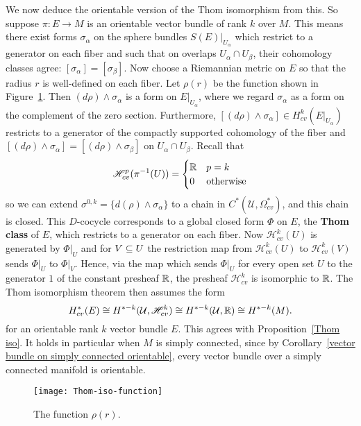 We now deduce the orientable version of the Thom isomorphism from this. So suppose $\pi:E\to M$ is an orientable vector bundle of rank $k$ over $M$. This means there 
exist forms $\sigma_\alpha$ on the sphere bundles $S(E)|_{U_\alpha}$ which restrict to a generator on each fiber and such that on overlaps $U_\alpha\cap U_\beta$, 
their cohomology classes agree: $[\sigma_\alpha]=[\sigma_\beta]$. Now choose a Riemannian metric on $E$ so that the radius $r$ is well-defined on each fiber. Let $\rho(r)$ 
be the function shown in Figure~\ref{Thom iso function rho(r)}. Then $(d\rho)\wedge\sigma_\alpha$ is a form on $E|_{U_\alpha}$, where we regard $\sigma_\alpha$ as a form 
on the complement of the zero section. Furthermore, $[(d\rho)\wedge\sigma_\alpha]\in H^k_{cv}(E|_{U_\alpha})$ restricts to a generator of the compactly supported 
cohomology of the fiber and $[(d\rho)\wedge\sigma_\alpha]=[(d\rho)\wedge\sigma_\beta]$ on $U_\alpha\cap U_\beta$. Recall that 
\[\mathscr{H}^p_{cv}(\pi^{-1}(U))=\begin{cases}
\mathbb{R}&p=k\\
0&\text{otherwise}
\end{cases}\]
so we can extend $\sigma^{0,k}=\{d(\rho)\wedge\sigma_\alpha\}$ to a chain in $C^*(\mathcal{U},\Omega_{cv}^*)$, and this chain is closed. This $D$-cocycle corresponds 
to a global closed form $\Phi$ on $E$, the \textbf{Thom class} of $E$, which restricts to a generator on each fiber. Now $\mathscr{H}^k_{cv}(U)$ is generated by 
$\Phi|_U$ and for $V\subseteq U$ the restriction map from $\mathscr{H}^k_{cv}(U)$ to $\mathscr{H}^k_{cv}(V)$ sends $\Phi|_U$ to $\Phi|_V$. Hence, via the map which sends 
$\Phi|_U$ for every open set $U$ to the generator $1$ of the constant presheaf $\mathbb{R}$, the presheaf $\mathscr{H}^k_{cv}$ is isomorphic to $\mathbb{R}$. The Thom isomorphism 
theorem then assumes the form
\[H^*_{cv}(E)\cong H^{*-k}(\mathcal{U},\mathscr{H}^k_{cv})\cong H^{*-k}(\mathcal{U},\mathbb{R})\cong H^{*-k}(M).\]
for an orientable rank $k$ vector bundle $E$. This agrees with Proposition~\ref{Thom iso}. It holds in particular when $M$ is simply connected, since by 
Corollary~\ref{vector bundle on simply connected orientable}, every vector bundle over a simply connected manifold is orientable.
\begin{figure}[htbp]
\centering
\texttt{[image: Thom-iso-function]}
\caption{The function $\rho(r)$.}
\label{Thom iso function rho(r)}
\end{figure}

